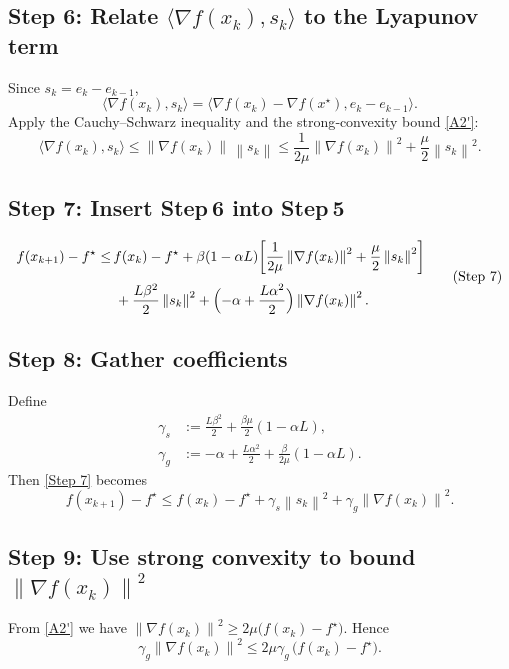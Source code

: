 \documentclass[11pt]{article}
\newcommand{\norm}[1]{\left\lVert#1\right\rVert}
\begin{document}
\subsection*{Step 6: Relate $\langle\nabla f(x_{k}),s_{k}\rangle$ to the Lyapunov term}
Since $s_{k}=e_{k}-e_{k-1}$,
\[
\langle\nabla f(x_{k}),s_{k}\rangle
= \langle\nabla f(x_{k})- \nabla f(x^{\star}),e_{k}-e_{k-1}\rangle.
\]
Apply the Cauchy–Schwarz inequality and the strong‑convexity bound \eqref{A2'}:
\[
\langle\nabla f(x_{k}),s_{k}\rangle
\le \norm{\nabla f(x_{k})}\,\norm{s_{k}}
\le\frac{1}{2\mu}\norm{\nabla f(x_{k})}^{2}+\frac{\mu}{2}\norm{s_{k}}^{2}.
\tag{Step 6}
\]

\subsection*{Step 7: Insert Step 6 into Step 5}
\[
\begin{aligned}
f(x_{k+1})-f^{\star}
\le &\, f(x_{k})-f^{\star}
   +\beta(1-\alpha L)\!\left[\frac{1}{2\mu}\norm{\nabla f(x_{k})}^{2}
                               +\frac{\mu}{2}\norm{s_{k}}^{2}\right]\\[1mm]
   &\;+\frac{L\beta^{2}}{2}\norm{s_{k}}^{2}
   +\Bigl(-\alpha+\frac{L\alpha^{2}}{2}\Bigr)\norm{\nabla f(x_{k})}^{2}.
\end{aligned}
\tag{Step 7}
\]

\subsection*{Step 8: Gather coefficients}
Define
\[
\begin{aligned}
\gamma_{s}&:=\frac{L\beta^{2}}{2}
            +\frac{\beta\mu}{2}(1-\alpha L),\\[1mm]
\gamma_{g}&:= -\alpha+\frac{L\alpha^{2}}{2}
            +\frac{\beta}{2\mu}(1-\alpha L).
\end{aligned}
\]
Then \eqref{Step 7} becomes
\[
f(x_{k+1})-f^{\star}
\le f(x_{k})-f^{\star}
   +\gamma_{s}\norm{s_{k}}^{2}
   +\gamma_{g}\norm{\nabla f(x_{k})}^{2}.
\tag{Step 8}
\]

\subsection*{Step 9: Use strong convexity to bound $\norm{\nabla f(x_{k})}^{2}$}
From \eqref{A2'} we have $\norm{\nabla f(x_{k})}^{2}\ge 2\mu\bigl(f(x_{k})-f^{\star}\bigr)$.  Hence
\[
\gamma_{g}\norm{\nabla f(x_{k})}^{2}
\le 2\mu\gamma_{g}\,\bigl(f(x_{k})-f^{\star}\bigr).
\tag{Step 9}
\]
\end{document}
